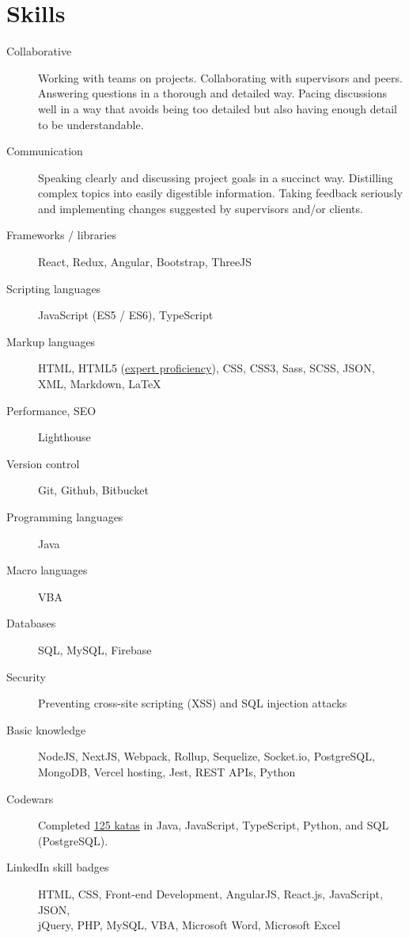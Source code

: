 \documentclass{article}
\begin{document}
\vspace{-1em}
\section*{Skills}\vspace{-0.5em}

\begin{description}
  \item [Collaborative] Working with teams on projects. Collaborating with supervisors and peers. Answering questions in a thorough and detailed way. Pacing discussions well in a way that avoids being too detailed but also having enough detail to be understandable.
  \item [Communication] Speaking clearly and discussing project goals in a succinct way. Distilling complex topics into easily digestible information. Taking feedback seriously and implementing changes suggested by supervisors and/or clients.
  \item [Frameworks / libraries] React, Redux, Angular, Bootstrap, ThreeJS
  \item [Scripting languages] JavaScript (ES5 / ES6), TypeScript
  \item [Markup languages] HTML, HTML5 (\href{https://app.pluralsight.com/profile/alexander-koik-cesto}{expert proficiency}), CSS, CSS3, Sass, SCSS, JSON, XML, Markdown, LaTeX
  \item [Performance, SEO] Lighthouse
  \item [Version control] Git, Github, Bitbucket
  \item [Programming languages] Java
  \item [Macro languages] VBA
  \item [Databases] SQL, MySQL, Firebase
  \item [Security] Preventing cross-site scripting (XSS) and SQL injection attacks
  \item [Basic knowledge] NodeJS, NextJS, Webpack, Rollup, Sequelize, Socket.io, PostgreSQL, MongoDB, Vercel hosting, Jest, REST APIs, Python
  \item [Codewars] Completed \href{https://www.codewars.com/users/sirkoik}{125 katas} in Java, JavaScript, TypeScript, Python, and SQL (PostgreSQL).
  \item [LinkedIn skill badges] HTML, CSS, Front-end Development, AngularJS, React.js, JavaScript, JSON,\\ jQuery, PHP, MySQL, VBA, Microsoft Word, Microsoft Excel
\end{description}
\end{document}
